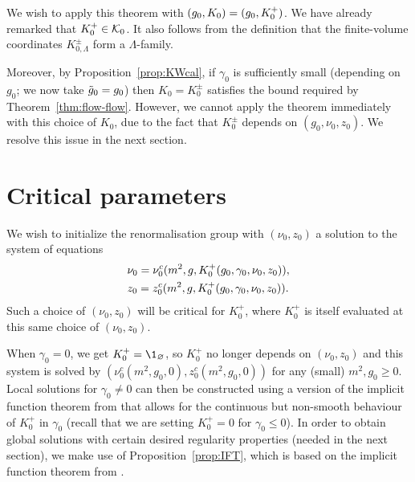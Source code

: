 We wish to apply this theorem with $(g_0, K_0) = (g_0, K^+_0)$.
We have already remarked that $K^+_0 \in \mathcal{K}_0$.
It also follows from the definition that
the finite-volume coordinates $K^\pm_{0,\Lambda}$ form a $\Lambda$-family.

Moreover,
by Proposition~\ref{prop:KWcal}, if
$\gamma_0$ is sufficiently small (depending on $g_0$; we now take $\tilde{g}_0=g_0$)
then $K_0 = K^\pm_0$ satisfies the bound required by Theorem~\ref{thm:flow-flow}.
However, we cannot apply the theorem immediately with this choice
of $K_0$,
due to the fact that $K^\pm_0$
depends on $(g_0, \nu_0, z_0)$.
We resolve this issue in the next section.

\section{Critical parameters}
\label{sec:nu0z0c}

We wish to initialize the renormalisation group with $(\nu_0, z_0)$ a solution
to the system of equations
\begin{align}
&\nu_0 = \nu_0^c(m^2, g, K^+_0(g_0, \gamma_0, \nu_0, z_0)), \label{e:mu0c}
\\
&z_0 = z_0^c(m^2, g, K^+_0(g_0, \gamma_0, \nu_0, z_0)) \label{e:z0c}
.
\end{align}
Such a choice of $(\nu_0, z_0)$ will be critical for $K^+_0$,
where $K^+_0$ is itself evaluated at this same choice of $(\nu_0, z_0)$.

When $\gamma_0 = 0$, we get $K^+_0 = \1_\varnothing$, so $K^+_0$ no longer depends on $(\nu_0, z_0)$
and this system is solved by $(\nu_0^c(m^2, g_0, 0), z_0^c(m^2, g_0, 0))$
for any (small) $m^2, g_0 \geq 0$.
Local solutions for $\gamma_0 \neq 0$ can then be
constructed using a version of the implicit function theorem from \cite{LS14}
that allows for the continuous but non-smooth behaviour of $K^+_0$ in $\gamma_0$
(recall that we are setting $K^+_0 = 0$ for $\gamma_0 \le 0$).
In order to obtain global solutions with certain desired regularity properties
(needed in the next section), we make use of Proposition~\ref{prop:IFT},
which is based on the implicit function theorem from \cite{LS14}.

